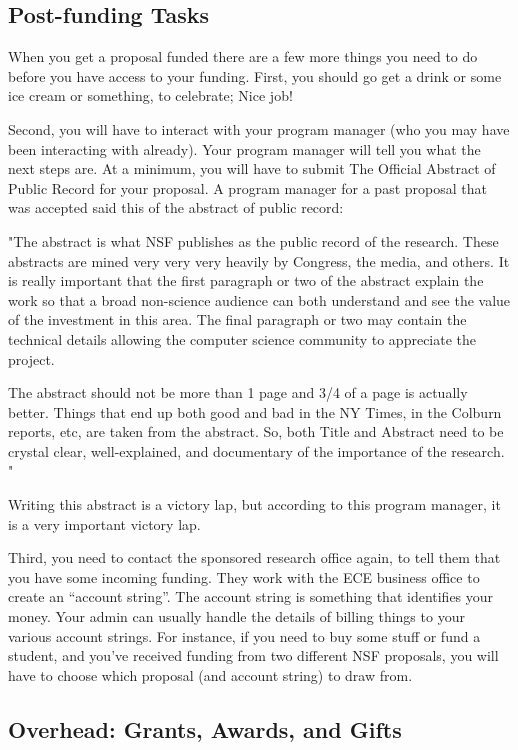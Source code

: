 \subsection{Post-funding Tasks}

When you get a proposal funded there are a few more things you need to do
before you have access to your funding.  First, you should go get a drink or
some ice cream or something, to celebrate;  Nice job!  

Second, you will have to interact with your program manager (who you may have
been interacting with already).  Your program manager will tell you what the
next steps are.  At a minimum, you will have to submit The Official Abstract of
Public Record for your proposal.  A program manager for a past proposal that
was accepted said this of the abstract of public record:

  "The abstract is what NSF publishes as the public record of the research.
  These abstracts are mined very very very heavily by Congress, the media, and
  others.  It is really important that the first paragraph or two of the abstract
  explain the work so that a broad non-science audience can both understand and
  see the value of the investment in this area.  The final paragraph or two may
  contain the technical details allowing the computer science community to
  appreciate the project. 

  The abstract should not be more than 1 page and 3/4 of a page is actually better.
  Things that end up both good and bad in the NY Times, in the Colburn reports, etc, 
  are taken from the abstract.  So, both Title and Abstract need to be crystal clear, 
  well-explained, and documentary of the importance of the research.  "

Writing this abstract is a victory lap, but according to this program manager,
it is a very important victory lap.

Third, you need to contact the sponsored research office again, to tell them
that you have some incoming funding.  They work with the ECE business office to
create an ``account string''.  The account string is something that identifies
your money.  Your admin can usually handle the details of billing things to
your various account strings.   For instance, if you need to buy some stuff or
fund a student, and you've received funding from two different NSF proposals,
you will have to choose which proposal (and account string) to draw from.   

\subsection{Overhead: Grants, Awards, and Gifts}

